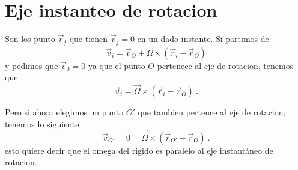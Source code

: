 \documentclass[../Main.tex]{subfiles}
\begin{document}
{    \section{Eje instanteo de rotacion}
    Son los punto $\vec{r}_{j}$ que tienen $\vec{v}_j = 0$ en un dado instante.
    Si partimos de
    \begin{equation*}
        \vec{v}_i = \vec{v}_O + \vec{\Omega} \times \left( \vec{r}_i - \vec{r}_O \right)
    \end{equation*}
    y pedimos que $\vec{v}_0 = 0$ ya que el punto $O$ pertenece al eje de rotacion,
    tenemos que
    \begin{equation*}
        \vec{v}_i = \vec{\Omega} \times \left( \vec{r}_i - \vec{r}_O \right) \ .
    \end{equation*}

    Pero si ahora elegimos un punto $O'$ que tambien pertence al eje de rotacion,
    tenemos lo siguiente
    \begin{equation*}
        \vec{v}_{O'} = 0 = \vec{\Omega} \times \left( \vec{r}_{O'} - \vec{r}_O \right) \ .
    \end{equation*}
    esto quiere decir que el omega del rigido es paralelo al eje instantáneo de rotacion.


}
\end{document}
